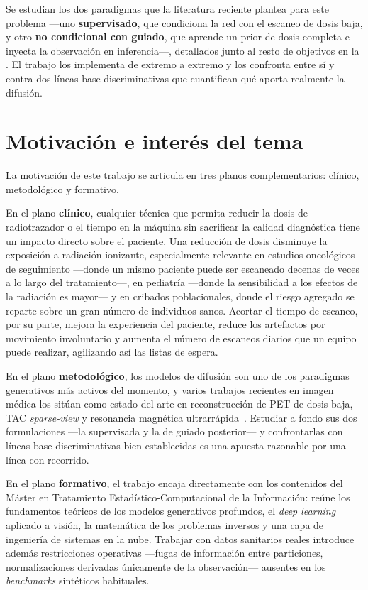 Se estudian los dos paradigmas que la literatura reciente plantea para
este problema ---uno \textbf{supervisado}, que condiciona la red con el
escaneo de dosis baja, y otro \textbf{no condicional con guiado}, que
aprende un prior de dosis completa e inyecta la observación en
inferencia---, detallados junto al resto de objetivos en la
. El trabajo los implementa de extremo a extremo y
los confronta entre sí y contra dos líneas base discriminativas que
cuantifican qué aporta realmente la difusión.

\section{Motivación e interés del tema}
\label{sec:motivacion}

La motivación de este trabajo se articula en tres planos
complementarios: clínico, metodológico y formativo.

En el plano \textbf{clínico}, cualquier técnica que permita reducir
la dosis de radiotrazador o el tiempo en la máquina sin sacrificar
la calidad diagnóstica tiene un impacto directo sobre el paciente.
Una reducción de dosis disminuye la exposición a radiación
ionizante, especialmente relevante en estudios oncológicos de
seguimiento —donde un mismo paciente puede ser escaneado decenas de
veces a lo largo del tratamiento—, en pediatría —donde la
sensibilidad a los efectos de la radiación es mayor— y
en cribados poblacionales, donde el riesgo agregado se reparte
sobre un gran número de individuos sanos. Acortar el tiempo de
escaneo, por su parte, mejora la experiencia del paciente, reduce
los artefactos por movimiento involuntario y aumenta el número de
escaneos diarios que un equipo puede realizar, agilizando así
las listas de espera.

En el plano \textbf{metodológico}, los modelos de difusión son uno de
los paradigmas generativos más activos del momento, y varios trabajos
recientes en imagen médica los sitúan como estado del arte en
reconstrucción de PET de dosis baja, TAC \textit{sparse-view} y
resonancia magnética ultrarrápida~\cite{bjrai2024}. Estudiar a fondo
sus dos formulaciones ---la supervisada y la de guiado posterior--- y
confrontarlas con líneas base discriminativas bien establecidas es una
apuesta razonable por una línea con recorrido.

En el plano \textbf{formativo}, el trabajo encaja directamente con los
contenidos del Máster en Tratamiento Estadístico-Computacional de la
Información: reúne los fundamentos teóricos de los modelos generativos
profundos, el \textit{deep learning} aplicado a visión, la matemática
de los problemas inversos y una capa de ingeniería de sistemas en la
nube. Trabajar con datos sanitarios reales introduce además
restricciones operativas —fugas de información entre particiones,
normalizaciones derivadas únicamente de la observación— ausentes en los
\textit{benchmarks} sintéticos habituales.

